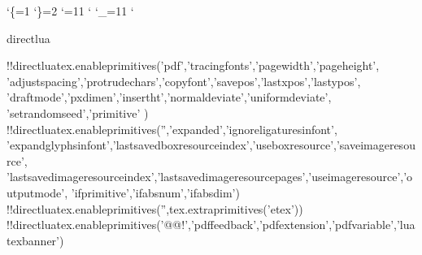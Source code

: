 
\catcode`\{=1
\catcode`\}=2
\catcode`\@=11
\catcode`
\catcode`\_=11
\catcode`

\let\@@!directlua\directlua \let\directlua\undefined

\@@!directlua{tex.enableprimitives('pdf',{'tracingfonts','pagewidth','pageheight',
'adjustspacing','protrudechars','copyfont','savepos','lastxpos','lastypos',
'draftmode','pxdimen','insertht','normaldeviate','uniformdeviate', 'setrandomseed','primitive'
})}
\@@!directlua{tex.enableprimitives('',{'expanded','ignoreligaturesinfont',
'expandglyphsinfont','lastsavedboxresourceindex','useboxresource','saveimageresource',
'lastsavedimageresourceindex','lastsavedimageresourcepages','useimageresource','outputmode',
'ifprimitive','ifabsnum','ifabsdim'})}
\@@!directlua{tex.enableprimitives('',tex.extraprimitives('etex'))}
\@@!directlua{tex.enableprimitives('@@!',{'pdffeedback','pdfextension','pdfvariable','luatexbanner'})}



\let\pdfnoligatures     \ignoreligaturesinfont       \let\ignoreligaturesinfont\undefined
\let\pdffontexpand      \expandglyphsinfont          \let\expandglyphsinfont\undefined
\let\pdfxform           \saveboxresource             \let\saveboxresource\undefined
\let\pdflastxform       \lastsavedboxresourceindex   \let\lastsavedboxresourceindex\undefined
\let\pdfrefxform        \useboxresource              \let\useboxresource\undefined
\let\pdfximage          \saveimageresource           \let\saveimageresource\undefined
\let\pdflastximage      \lastsavedimageresourceindex \let\lastsavedimageresourceindex\undefined
\let\pdflastximagepages \lastsavedimageresourcepages \let\lastsavedimageresourcepages\undefined
\let\pdfrefximage       \useimageresource            \let\useimageresource\undefined

\let\pdfoutput          \outputmode                  \let\outputmode\undefined

